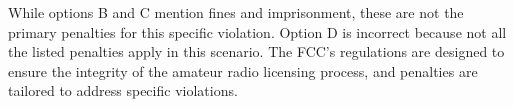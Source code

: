 While options B and C mention fines and imprisonment, these are not the primary penalties for this specific violation. Option D is incorrect because not all the listed penalties apply in this scenario. The FCC’s regulations are designed to ensure the integrity of the amateur radio licensing process, and penalties are tailored to address specific violations.

